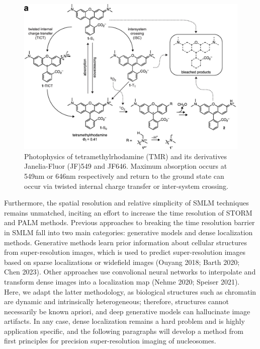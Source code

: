 \documentclass{ucetd}
\begin{document}
\begin{figure}
\begin{center}
\includegraphics[width=14cm]{Rhodamines.png}
\end{center}
\caption{Photophysics of tetramethylrhodamine (TMR) and its derivatives Janelia-Fluor (JF)549 and JF646. Maximum absorption occurs at 549nm or 646nm respectively and return to the ground state can occur via twisted internal charge transfer or inter-system crossing.}
\end{figure}


Furthermore, the spatial resolution and relative simplicity of SMLM techniques remains unmatched, inciting an effort to increase the time resolution of STORM and PALM methods. Previous approaches to breaking the time resolution barrier in SMLM fall into two main categories: generative models and dense localization methods. Generative methods learn prior information about cellular structures from super-resolution images, which is used to predict super-resolution images based on sparse localizations or widefield images (Ouyang 2018; Barth 2020; Chen 2023). Other approaches use convolional neural networks to interpolate and transform dense images into a localization map (Nehme 2020; Speiser 2021). Here, we adapt the latter methodology, as biological structures such as chromatin are dynamic and intrinsically heterogeneous; therefore, structures cannot necessarily be known apriori, and deep generative models can hallucinate image artifacts. In any case, dense localization remains a hard problem and is highly application specific, and the following paragraphs will develop a method from first principles for precision super-resolution imaging of nucleosomes. 
\end{document}
